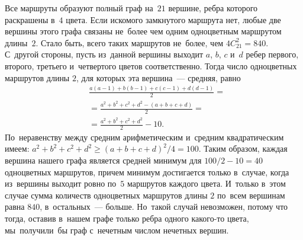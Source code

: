 \ifincludesolutions
Все маршруты образуют полный граф на~$21$ вершине, ребра которого раскрашены
в~$4$ цвета.
Если искомого замкнутого маршрута нет, любые две вершины этого графа связаны
не~более чем одним одноцветным маршрутом длины~$2$.
Стало быть, всего таких маршрутов не~более, чем $4 C_{21}^2 = 840$.
С~другой стороны, пусть из~данной вершины выходит $a$, $b$, $c$ и~$d$ ребер
первого, второго, третьего и~четвертого цветов соответственно.
Тогда число одноцветных маршрутов длины $2$, для которых эта
вершина~— средняя, равно
\begin{align*}
    &
    \frac{
        a (a - 1) + {} b (b - 1) + c (c - 1) + d (d - 1)
    }{2}
=\\&{}=
    \frac{a^2 + b^2 + c^2 + d^2 - (a + b + c + d)}{2}
=\\&{}=
    \frac{a^2 + b^2 + c^2 + d^2}{2} - 10
.\end{align*}
По~неравенству между средним арифметическим и~средним квадратическим имеем:
\(
    a^2 + b^2 + c^2 + d^2
\geq
    (a + b + c + d)^2 / 4
=
    100
\).
Таким образом, каждая вершина нашего графа является средней минимум для
$100 / 2 - 10 = 40$ одноцветных маршрутов, причем минимум достигается только
в~случае, когда из~вершины выходит ровно по~$5$ маршрутов каждого цвета.
И~только в~этом случае сумма количеств одноцветных маршрутов длины $2$ по~всем
вершинам равна $840$, в~остальных~— больше.
Но~такой случай невозможен, потому что тогда, оставив в~нашем графе только
ребра одного какого-то цвета, мы~получили~бы граф с~нечетным числом нечетных
вершин.
\fi %

\endgroup %

